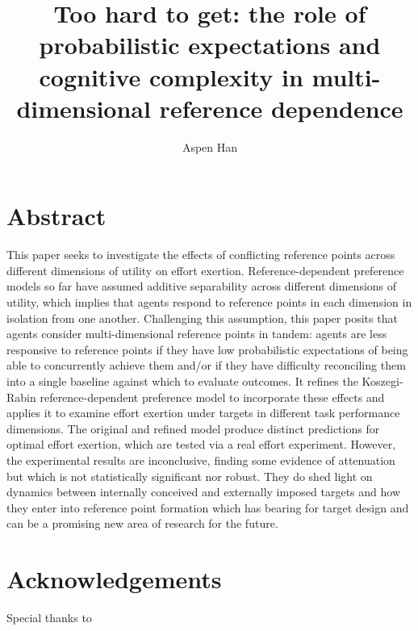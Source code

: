 \documentclass[12pt, letterpaper, DIV=11, numbers=noendperiod]{article}
\title{Too hard to get: the role of probabilistic expectations and cognitive complexity in multi-dimensional reference dependence}
\author{Aspen Han}
\date{}
\begin{document}
\maketitle


\newpage

\section{Abstract}\label{abstract}

This paper seeks to investigate the effects of conflicting reference points across different dimensions of utility on effort exertion. Reference-dependent preference models so far have assumed additive separability across different dimensions of utility, which implies that agents respond to reference points in each dimension in isolation from one another. Challenging this assumption, this paper posits that agents consider multi-dimensional reference points in tandem: agents are less responsive to reference points if they have low probabilistic expectations of being able to concurrently achieve them and/or if they have difficulty reconciling them into a single baseline against which to evaluate outcomes. It refines the Koszegi-Rabin reference-dependent preference model to incorporate these effects and applies it to examine effort exertion under targets in different task performance dimensions. The original and refined model produce distinct predictions for optimal effort exertion, which are tested via a real effort experiment. However, the experimental results are inconclusive, finding some evidence of attenuation but which is not statistically significant nor robust. They do shed light on dynamics between internally conceived and externally imposed targets and how they enter into reference point formation which has bearing for target design and can be a promising new area of research for the future.

\newpage

\section{Acknowledgements}\label{acknowledgements}

Special thanks to
\end{document}
